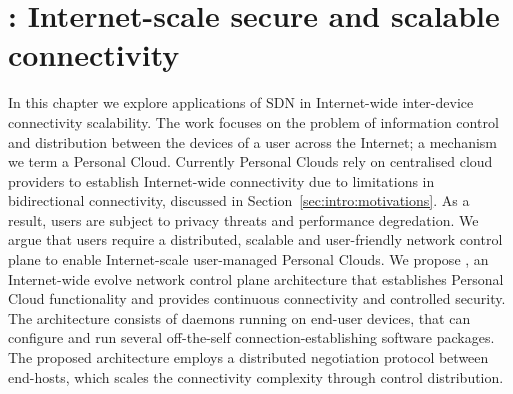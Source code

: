 \chapter{\signpost: Internet-scale secure and scalable connectivity}
\label{sec:signpost}
\ifpdf
    \graphicspath{{Chapter3/Chapter3Figs/PNG/}{Chapter3/Chapter3Figs/PDF/}{Chapter3/Chapter3Figs/}}
\else
    \graphicspath{{Chapter3/Chapter3Figs/EPS/}{Chapter3/Chapter3Figs/}}
\fi


In this chapter we explore applications of SDN in Internet-wide inter-device
connectivity scalability.  The work focuses on the problem of information
control and distribution between the devices of a user across the Internet; a
mechanism we term a Personal Cloud.  Currently Personal Clouds rely on
centralised cloud providers to establish Internet-wide connectivity due to
limitations in bidirectional connectivity, discussed in
Section~\ref{sec:intro:motivations}. As a result, users are subject to privacy
threats and performance degredation. We argue that users require a distributed,
scalable and user-friendly network control plane  to enable Internet-scale
user-managed Personal Clouds.  We propose \signpost, an Internet-wide 
evolve network control plane architecture 
that establishes Personal Cloud functionality and provides
continuous connectivity and controlled security. The architecture consists of
daemons running on end-user devices, that can configure and run several
off-the-self connection-establishing software packages.  The proposed
architecture employs a distributed negotiation protocol between end-hosts, which
scales the connectivity complexity through control distribution.



